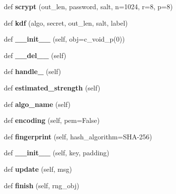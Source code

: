 \begin{DoxyCompactItemize}
def {\bfseries scrypt} (out\+\_\+len, password, salt, n=1024, r=8, p=8)
\item 
\mbox{\label{namespacebotan2_a2bdda3c82a8c1648359b0e6c462407b2}} 
def {\bfseries kdf} (algo, secret, out\+\_\+len, salt, label)
\item 
\mbox{\label{namespacebotan2_ac38d8328052f046bd090e31cc40ae7c8}} 
def {\bfseries \+\_\+\+\_\+init\+\_\+\+\_\+} (self, obj=c\+\_\+void\+\_\+p(0))
\item 
\mbox{\label{namespacebotan2_a50841957183ed3d44d0f630782cb6eaf}} 
def {\bfseries \+\_\+\+\_\+del\+\_\+\+\_\+} (self)
\item 
\mbox{\label{namespacebotan2_afffc6de3f085c6ad6720263ff7b9346d}} 
def {\bfseries handle\+\_\+} (self)
\item 
\mbox{\label{namespacebotan2_a6b045b8c034b41855e0f56b7c57bf053}} 
def {\bfseries estimated\+\_\+strength} (self)
\item 
\mbox{\label{namespacebotan2_a31810ea673649bb5990e46bad50602a2}} 
def {\bfseries algo\+\_\+name} (self)
\item 
\mbox{\label{namespacebotan2_adb34d9c637276932542829ffc468dcaf}} 
def {\bfseries encoding} (self, pem=False)
\item 
\mbox{\label{namespacebotan2_afdf0ad2445f7f37c5b6d31ee42333b73}} 
def {\bfseries fingerprint} (self, hash\+\_\+algorithm=\textquotesingle{}S\+HA-\/256\textquotesingle{})
\item 
\mbox{\label{namespacebotan2_aab6fe89f0def8ffc80291fba31c6d688}} 
def {\bfseries \+\_\+\+\_\+init\+\_\+\+\_\+} (self, key, padding)
\item 
\mbox{\label{namespacebotan2_a7b4d806e68aa7eddb5e77add19190159}} 
def {\bfseries update} (self, msg)
\item 
\mbox{\label{namespacebotan2_ab590cadbbb9273afa5dee1d0da0cda02}} 
def {\bfseries finish} (self, rng\+\_\+obj)

\end{DoxyCompactItemize}
